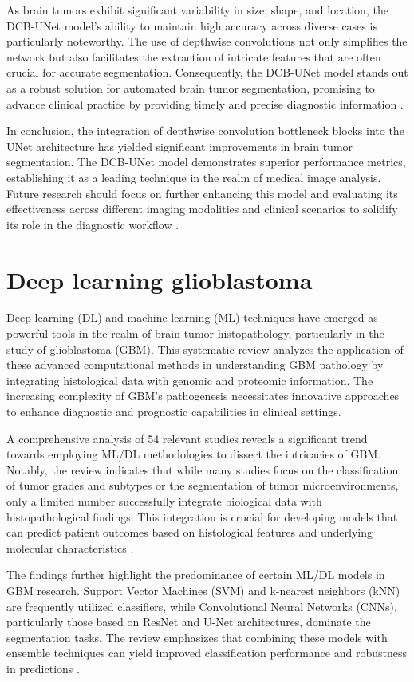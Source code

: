 \documentclass[runningheads]{llncs}
\begin{document}
As brain tumors exhibit significant variability in size, shape, and location, the DCB-UNet model's ability to maintain high accuracy across diverse cases is particularly noteworthy. The use of depthwise convolutions not only simplifies the network but also facilitates the extraction of intricate features that are often crucial for accurate segmentation. Consequently, the DCB-UNet model stands out as a robust solution for automated brain tumor segmentation, promising to advance clinical practice by providing timely and precise diagnostic information \cite{Kumar_2023, Joshi_2024, Xu_2024}.

In conclusion, the integration of depthwise convolution bottleneck blocks into the UNet architecture has yielded significant improvements in brain tumor segmentation. The DCB-UNet model demonstrates superior performance metrics, establishing it as a leading technique in the realm of medical image analysis. Future research should focus on further enhancing this model and evaluating its effectiveness across different imaging modalities and clinical scenarios to solidify its role in the diagnostic workflow \cite{Ding_2019, Karimzadeh_2021, Liu_2023}.
\section{Deep learning glioblastoma}
Deep learning (DL) and machine learning (ML) techniques have emerged as powerful tools in the realm of brain tumor histopathology, particularly in the study of glioblastoma (GBM). This systematic review analyzes the application of these advanced computational methods in understanding GBM pathology by integrating histological data with genomic and proteomic information. The increasing complexity of GBM's pathogenesis necessitates innovative approaches to enhance diagnostic and prognostic capabilities in clinical settings.

A comprehensive analysis of 54 relevant studies reveals a significant trend towards employing ML/DL methodologies to dissect the intricacies of GBM. Notably, the review indicates that while many studies focus on the classification of tumor grades and subtypes or the segmentation of tumor microenvironments, only a limited number successfully integrate biological data with histopathological findings. This integration is crucial for developing models that can predict patient outcomes based on histological features and underlying molecular characteristics \cite{20,34,41}.

The findings further highlight the predominance of certain ML/DL models in GBM research. Support Vector Machines (SVM) and k-nearest neighbors (kNN) are frequently utilized classifiers, while Convolutional Neural Networks (CNNs), particularly those based on ResNet and U-Net architectures, dominate the segmentation tasks. The review emphasizes that combining these models with ensemble techniques can yield improved classification performance and robustness in predictions \cite{33,41,42}.
\end{document}
